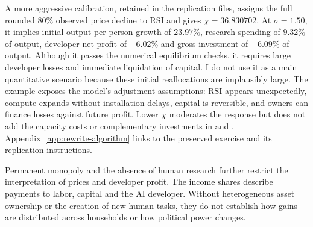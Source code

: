 A more aggressive calibration, retained in the replication files, assigns
the full rounded $80\%$ observed price decline to RSI and gives
$\chi=36.830702$. At $\sigma=1.50$, it implies initial output-per-person
growth of $23.97\%$, research spending of $9.32\%$ of output, developer
net profit of $-6.02\%$ and gross investment of $-6.09\%$ of output.
Although it passes the numerical equilibrium checks, it requires large
developer losses and immediate liquidation of capital. I do not use it
as a main quantitative scenario because these initial reallocations are
implausibly large. The example exposes the model's adjustment assumptions:
RSI appears unexpectedly, compute expands without installation delays,
capital is reversible, and owners can finance losses against future profit.
Lower $\chi$ moderates the response but does not add the capacity costs or
complementary investments in \citet{erdiletal2025gate} and
\citet{brynjolfssonrocksyverson2021}. Appendix~\ref{app:rewrite-algorithm}
links to the preserved exercise and its replication instructions.

Permanent monopoly and the absence of human research further restrict
the interpretation of prices and developer profit. The income shares
describe payments to labor, capital and the AI developer. Without
heterogeneous asset ownership or the creation of new human tasks, they
do not establish how gains are distributed across households or how
political power changes.
